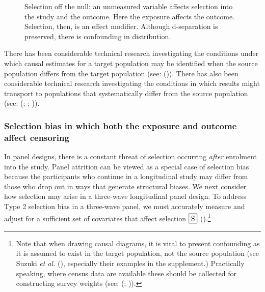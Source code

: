 \documentclass[
  singlecolumn,
  9pt]{article}
\begin{document}
\begin{figure}


\caption{\label{fig-2}Selection off the null: an unmeasured variable
affects selection into the study and the outcome. Here the exposure
affects the outcome. Selection, then, is an effect modifier. Although
d-separation is preserved, there is confounding in distribution.}

\end{figure}%

There has been considerable technical research investigating the
conditions under which causal estimates for a target population may be
identified when the source population differs from the target population
(see: ()). There has also
been considerable technical research investigating the conditions in
which results might transport to populations that systematically differ
from the source population (see:
(;
;
)).

\subsubsection{Selection bias in which both the exposure and outcome
affect
censoring}\label{selection-bias-in-which-both-the-exposure-and-outcome-affect-censoring}

In panel designs, there is a constant threat of selection occurring
\emph{after} enrolment into the study. Panel attrition can be viewed as
a special case of selection bias because the participants who continue
in a longitudinal study may differ from those who drop out in ways that
generate structural biases. We next consider how selection may arise in
a three-wave longitudinal panel design. To address Type 2 selection bias
in a three-wave panel, we must accurately measure and adjust for a
sufficient set of covariates that affect selection \(\framebox{S}\)
().\footnote{Note that when
  drawing causal diagrams, it is vital to present confounding as it is
  assumed to exist in the target population, not the source population
  (see Suzuki \emph{et al.} (),
  especially their examples in the supplement.) Practically speaking,
  where census data are available these should be collected for
  constructing survey weights (see: (; )).}
\end{document}
